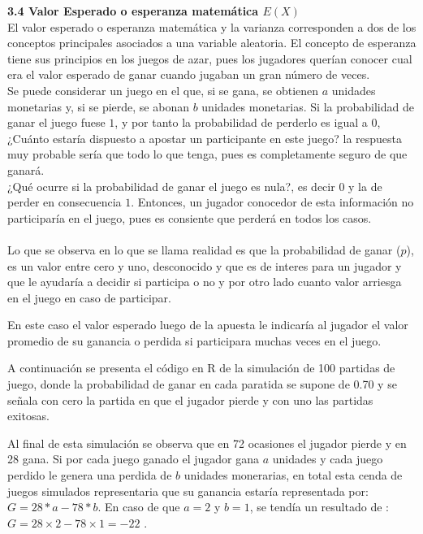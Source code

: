 \documentclass[base=hide,12pt]{elegantbook}
\begin{document}
\vspace{1cm} 	
\textcolor{col4}{\large \bf 3.4 Valor Esperado o esperanza matemática $E(X)$}\\

El valor esperado o esperanza matemática y la varianza corresponden a dos de los conceptos principales asociados a una variable aleatoria. El concepto de esperanza tiene sus principios en  los juegos de azar, pues los jugadores querían conocer cual era el valor esperado de ganar cuando jugaban un gran número de veces. \\

Se puede considerar un juego en el que, si se gana, se obtienen $a$ unidades monetarias y, si se pierde, se  abonan $b$ unidades monetarias. Si la probabilidad de ganar el juego fuese $1$, y por tanto la probabilidad de perderlo es igual a $0$, ¿Cuánto estaría dispuesto a apostar un  participante en este  juego? la respuesta muy probable sería que todo lo que tenga, pues es completamente seguro de que ganará. \\

¿Qué ocurre si la probabilidad de ganar el juego es nula?, es decir $0$ y la de perder en consecuencia $1$. Entonces, un jugador conocedor de esta información no participaría en el juego, pues es consiente que perderá en todos los casos. \\
\\

Lo que se observa en lo que se llama realidad es que la probabilidad de ganar ($p$), es un valor entre cero y uno, desconocido y que es de interes para un jugador y que le ayudaría a decidir si participa o no y por otro lado cuanto valor arriesga en el juego en caso de participar.

En este caso el valor esperado luego de la apuesta le indicaría al jugador el valor promedio de su ganancia o perdida si participara muchas veces en el juego. 

A continuación se presenta el código en R de la simulación de 100 partidas de juego, donde la probabilidad de ganar en cada paratida se supone de 0.70 y se señala con cero la partida en que el jugador pierde y con uno las partidas exitosas.

Al final de esta simulación se observa que en 72 ocasiones el jugador pierde y en 28 gana. Si por cada juego ganado el jugador gana $a$ unidades y cada juego perdido le genera una perdida de $b$ unidades monerarias,  en total esta cenda de juegos simulados representaria que su ganancia estaría representada por: $G= 28* a -78 * b$. En caso de que $a=2$ y $b=1$, se tendía un resultado de : $G=28 \times 2 -78 \times 1 =-22$ . \\
\end{document}
